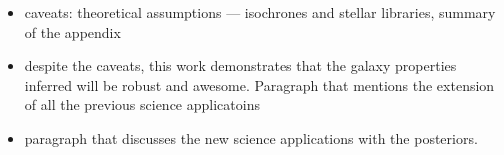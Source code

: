 \begin{itemize}
    \item caveats: theoretical assumptions --- isochrones and stellar
        libraries, summary of the appendix
\end{itemize}

\begin{itemize}
\item despite the caveats, this work demonstrates that the galaxy
    properties inferred will be robust and awesome. Paragraph that mentions
    the extension of all the previous science applicatoins 
\item paragraph that discusses the new science applications with the
    posteriors. 
\end{itemize}
